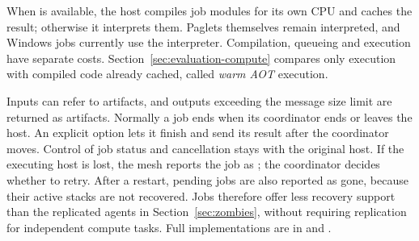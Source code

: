 When  is available, the host compiles job modules for
its own CPU and caches the result; otherwise it interprets them. Paglets
themselves remain interpreted, and Windows jobs currently use the
interpreter. Compilation, queueing and execution have separate costs.
Section~\ref{sec:evaluation-compute} compares only execution with compiled
code already cached, called \emph{warm AOT} execution.

Inputs can refer to artifacts, and outputs exceeding the message size
limit are returned as artifacts. Normally a job ends when its coordinator
ends or leaves the host. An explicit option lets it finish and send its
result after the coordinator moves. Control of job status and cancellation
stays with the original host. If the executing host is lost, the mesh
reports the job as ; the coordinator decides whether to retry.
After a restart, pending jobs are also reported as gone, because their
active stacks are not recovered. Jobs therefore offer less recovery
support than the replicated agents in Section~\ref{sec:zombies}, without
requiring replication for independent compute tasks. Full implementations
are in 
and .
